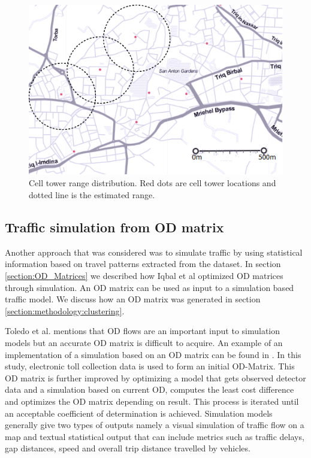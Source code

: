 \documentclass[12pt, a4paper]{report}
\theoremstyle{definition}
\theoremstyle{definition}%
\theoremstyle{definition}%
\theoremstyle{definition}%
\theoremstyle{definition}%
\theoremstyle{definition}%
\begin{document}
\begin{figure}[h]	
	\includegraphics[scale=0.75]{cell_towers_distribution}
	\centering
	\caption[Cell tower distance range]{Cell tower range distribution. Red dots are cell tower locations and dotted line is the estimated range.}
	\label{fig:cell_towers_distribution}
\end{figure}

\subsection{Traffic simulation from OD matrix} \label{subsection:methodology:traffic_simulation_ODMatrix}
Another approach that was considered was to simulate traffic by using statistical information based on travel patterns extracted from the dataset. In section \ref{section:OD_Matrices} we described how Iqbal et al optimized OD matrices through simulation. An OD matrix can be used as input to a simulation based traffic model. We discuss how an OD matrix was generated in section \ref{section:methodology:clustering}. 
 
Toledo et al. \cite{Toledo2004} mentions that OD flows are an important input to simulation models but an accurate OD matrix is difficult to acquire. An example of an implementation of a simulation based on an OD matrix can be found in \cite{Hirai2015}. In this study, electronic toll collection data is used to form an initial OD-Matrix. This OD matrix is further improved by optimizing a model that gets observed detector data and a simulation based on current OD, computes the least cost difference and optimizes the OD matrix depending on result. This process is iterated until an acceptable coefficient of determination is achieved. Simulation models generally give two types of outputs namely a visual simulation of traffic flow on a map and textual statistical output that can include metrics such as traffic delays, gap distances, speed and overall trip distance travelled by vehicles.
\end{document}
